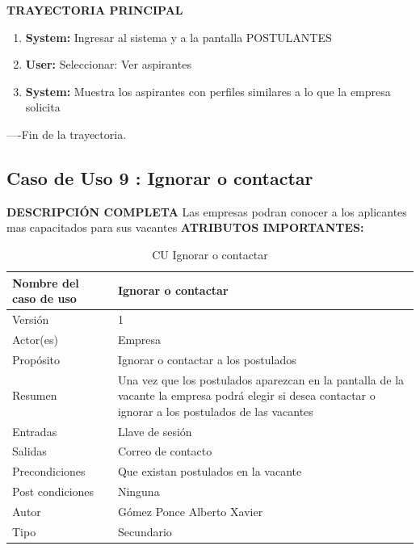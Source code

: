 \textbf{TRAYECTORIA PRINCIPAL}			
\begin{enumerate}			
\item \textbf{	System: 	}	Ingresar al sistema y a la pantalla POSTULANTES
\item \textbf{	User: 	}	Seleccionar: Ver aspirantes
\item \textbf{	System: 	}	Muestra los aspirantes con perfiles similares a lo que la empresa solicita
			
			
			
			
			
			
\end{enumerate}			
----Fin de la trayectoria.			
			


\newpage			
\subsection{Caso de Uso 	9	: Ignorar o contactar	}
		\textbf{DESCRIPCIÓN COMPLETA}	
		\newline 	
		Las empresas podran conocer a los aplicantes mas capacitados para sus vacantes	
\newline	\newline	\textbf{ATRIBUTOS IMPORTANTES:}	


\begin{table}[h]			
        \begin{center}			
\begin{tabular}{|l|p{11cm}|} \hline			
Nombre del caso de uso	&	Ignorar o contactar	\\ \hline
Versión	&	1	\\ \hline
Actor(es)	&	Empresa	\\ \hline
Propósito	&	Ignorar o contactar a los postulados 	\\ \hline
Resumen	&	Una vez que los postulados aparezcan en la pantalla de la vacante la empresa podrá elegir si desea contactar o ignorar a los postulados de las vacantes	\\ \hline
Entradas	&	Llave de sesión\\ \hline
Salidas	&	Correo de contacto 	\\ \hline
Precondiciones	&	Que existan postulados en la vacante 	\\ \hline
Post condiciones	&	Ninguna	\\ \hline
Autor	&	Gómez Ponce Alberto Xavier	\\ \hline
Tipo	&	Secundario	\\ \hline
\end{tabular}			
        \caption	{	CU Ignorar o contactar	}
        \label	{tabla	9	}
        \end{center}			
\end{table}			


